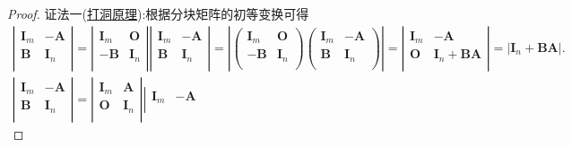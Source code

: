 \documentclass[lang=cn,newtx,10pt,scheme=chinese]{elegantbook}
\begin{document}
\begin{proof}
{\color{blue}证法一(\hyperref[proposition:打洞原理]{打洞原理}):}根据分块矩阵的初等变换可得\begin{align*}
\left| \begin{matrix}
\boldsymbol{I}_m&		-\boldsymbol{A}\\
\boldsymbol{B}&		\boldsymbol{I}_n\\
\end{matrix} \right|=\left| \begin{matrix}
\boldsymbol{I}_m&		\boldsymbol{O}\\
-\boldsymbol{B}&		\boldsymbol{I}_n\\
\end{matrix} \right|\left| \begin{matrix}
\boldsymbol{I}_m&		-\boldsymbol{A}\\
\boldsymbol{B}&		\boldsymbol{I}_n\\
\end{matrix} \right|=\left| \left( \begin{matrix}
\boldsymbol{I}_m&		\boldsymbol{O}\\
-\boldsymbol{B}&		\boldsymbol{I}_n\\
\end{matrix} \right) \left( \begin{matrix}
\boldsymbol{I}_m&		-\boldsymbol{A}\\
\boldsymbol{B}&		\boldsymbol{I}_n\\
\end{matrix} \right) \right|=\left| \begin{matrix}
\boldsymbol{I}_m&		-\boldsymbol{A}\\
\boldsymbol{O}&		\boldsymbol{I}_n+\boldsymbol{BA}\\
\end{matrix} \right|=\left| \boldsymbol{I}_n+\boldsymbol{BA} \right|.
\\
\left| \begin{matrix}
\boldsymbol{I}_m&		-\boldsymbol{A}\\
\boldsymbol{B}&		\boldsymbol{I}_n\\
\end{matrix} \right|=\left| \begin{matrix}
\boldsymbol{I}_m&		\boldsymbol{A}\\
\boldsymbol{O}&		\boldsymbol{I}_n\\
\end{matrix} \right|\left| \begin{matrix}
\boldsymbol{I}_m&		-\boldsymbol{A}\\

\end{matrix}
\end{align*}
\end{proof}
\end{document}
